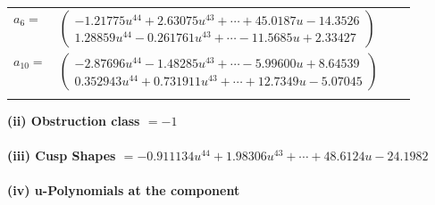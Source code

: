\documentclass[1p]{elsarticle_modified}
\theoremstyle{definition}
\begin{document}
\begin{tabular}{m{7pt} m{180pt} m{7pt} m{180pt} }
\flushright $a_{6}=$&$\begin{pmatrix}-1.21775 u^{44}+2.63075 u^{43}+\cdots+45.0187 u-14.3526\\1.28859 u^{44}-0.261761 u^{43}+\cdots-11.5685 u+2.33427\end{pmatrix}$ \\
\flushright $a_{10}=$&$\begin{pmatrix}-2.87696 u^{44}-1.48285 u^{43}+\cdots-5.99600 u+8.64539\\0.352943 u^{44}+0.731911 u^{43}+\cdots+12.7349 u-5.07045\end{pmatrix}$\\&\end{tabular}
\flushleft \textbf{(ii) Obstruction class $= -1$}\\~\\
\flushleft \textbf{(iii) Cusp Shapes $= -0.911134 u^{44}+1.98306 u^{43}+\cdots+48.6124 u-24.1982$}\\~\\
\newpage\renewcommand{\arraystretch}{1}
\flushleft \textbf{(iv) u-Polynomials at the component}\newline \\
\end{document}
